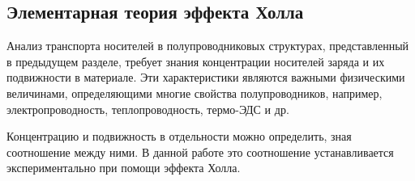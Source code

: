 \documentclass[a4paper,14pt]{extarticle}
\begin{document}


\subsection{Элементарная теория эффекта Холла}
Анализ транспорта носителей в полупроводниковых структурах, представленный в предыдущем разделе, требует знания концентрации носителей заряда и их подвижности в материале. Эти характеристики являются важными физическими величинами, определяющими многие свойства полупроводников, например, электропроводность, теплопроводность, термо-ЭДС и др.

Концентрацию и подвижность в отдельности можно определить, зная соотношение между ними. В данной работе это соотношение устанавливается экспериментально при помощи эффекта Холла.
\end{document}
